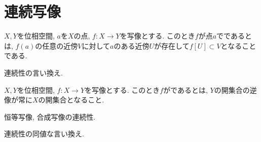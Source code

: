 \documentclass[uplatex, dvipdfmx, a4paper, 12pt, class=jsbook, crop=false]{standalone}
\begin{document}
\section{連続写像}
\label{sec:continuous-maps}

\begin{definition}
	$ X, Y $を位相空間, $ a $を$ X $の点, $ f \colon X \rightarrow Y $を写像とする.
	このとき$ f $が点$ a $でであるとは, $ f(a) $の任意の近傍$ V $に対して$ a $のある近傍$ U $が存在して$ f[U] \subset V $となることである.
\end{definition}

\begin{proposition}
	連続性の言い換え.
\end{proposition}

\begin{definition}
	$ X, Y $を位相空間, $ f \colon X \rightarrow Y $を写像とする.
	このとき$ f $がであるとは, $ Y $の開集合の逆像が常に$ X $の開集合となること.
\end{definition}

恒等写像, 合成写像の連続性.

\begin{proposition}
	連続性の同値な言い換え.
\end{proposition}
\end{document}
